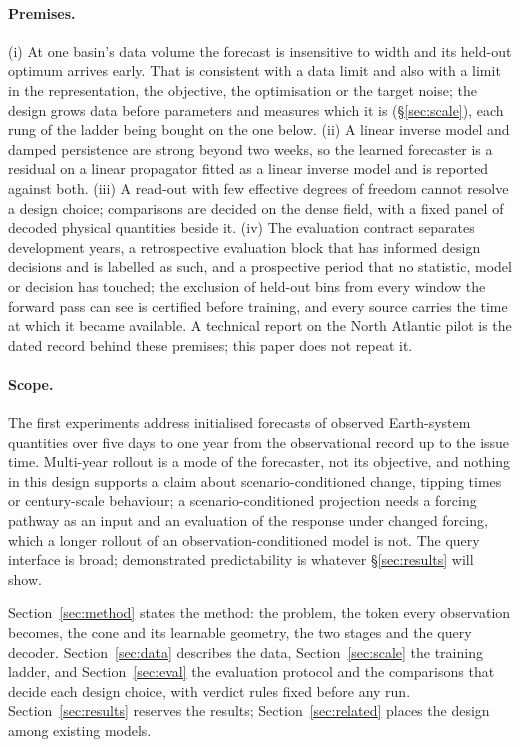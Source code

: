 \documentclass[10pt]{article}
\begin{document}
\paragraph{Premises.} (i) At one basin's data volume the forecast is
insensitive to width and its held-out optimum arrives early. That is
consistent with a data limit and also with a limit in the representation,
the objective, the optimisation or the target noise; the design grows data
before parameters and measures which it is (\S\ref{sec:scale}), each rung of
the ladder being bought on the one below. (ii) A linear inverse model and
damped persistence are strong beyond two weeks, so the learned forecaster is
a residual on a linear propagator fitted as a linear inverse model and is
reported against both. (iii) A read-out with few effective degrees of freedom
cannot resolve a design choice; comparisons are decided on the dense field,
with a fixed panel of decoded physical quantities beside it. (iv) The
evaluation contract separates development years, a retrospective evaluation
block that has informed design decisions and is labelled as such, and a
prospective period that no statistic, model or decision has touched; the
exclusion of held-out bins from every window the forward pass can see is
certified before training, and every source carries the time at which it
became available. A technical report on the North Atlantic pilot
\cite{techreport} is the dated record behind these premises; this paper does
not repeat it.

\paragraph{Scope.} The first experiments address initialised forecasts of
observed Earth-system quantities over five days to one year from the
observational record up to the issue time. Multi-year rollout is a mode of
the forecaster, not its objective, and nothing in this design supports a
claim about scenario-conditioned change, tipping times or century-scale
behaviour; a scenario-conditioned projection needs a forcing pathway as an
input and an evaluation of the response under changed forcing, which a longer
rollout of an observation-conditioned model is not. The query interface is
broad; demonstrated predictability is whatever \S\ref{sec:results} will
show.

Section~\ref{sec:method} states the method: the problem, the token every
observation becomes, the cone and its learnable geometry, the two stages and
the query decoder. Section~\ref{sec:data} describes the data,
Section~\ref{sec:scale} the training ladder, and
Section~\ref{sec:eval} the evaluation protocol and the comparisons that
decide each design choice, with verdict rules fixed before any run.
Section~\ref{sec:results} reserves the results; Section~\ref{sec:related}
places the design among existing models.
\end{document}
